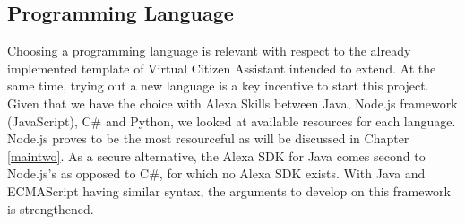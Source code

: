 	
	
	\subsection*{Programming Language}
	Choosing a programming language is relevant %
	with respect to the already implemented template of %
	Virtual Citizen Assistant %
	intended to extend. At the same time, trying out a new language is a key incentive to start this project. Given that we have the %
	choice with Alexa Skills between Java, Node.js framework (JavaScript), C\# and Python, we looked at available resources for each language. Node.js proves to be the most resourceful as will be discussed in Chapter \ref{maintwo}. As a secure alternative, the Alexa SDK for Java comes second to Node.js's as opposed to C\#, for which no Alexa SDK exists. With Java and ECMAScript having similar syntax, the arguments to develop on this framework is strengthened.
	



%
%




%



